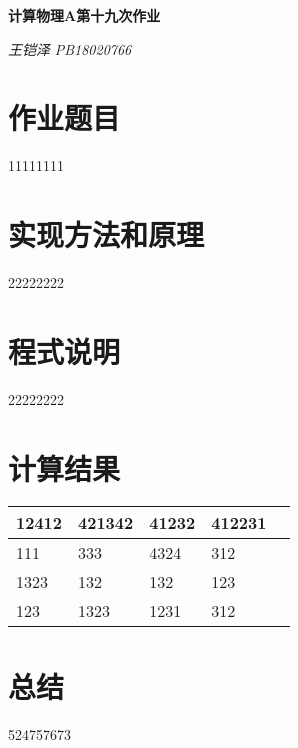 \documentclass[UTF8]{ctexart}
\begin{document}
	\centering\textbf{\LARGE{计算物理A第十九次作业}}
	
	
	\textit{王铠泽}\qquad\textit{ PB18020766}
	
		
	\section{作业题目}
	
	11111111
	
	\section{实现方法和原理}
	
	22222222
	
	\section{程式说明}
	
	22222222
	
	\section{计算结果}
	
	\begin{table}[H]
			\centering
			\begin{tabular}{@{}lllll@{}}
				\toprule
				12412& 421342 &41232  & 412231 &  \\ \midrule
				111&  333&  4324&  312&  \\
				1323&  132&  132&  123&  \\
				123&  1323&  1231&  312&  \\ \bottomrule
			\end{tabular}
		\end{table}

%		

	\section{总结}

	524757673
\end{document}
